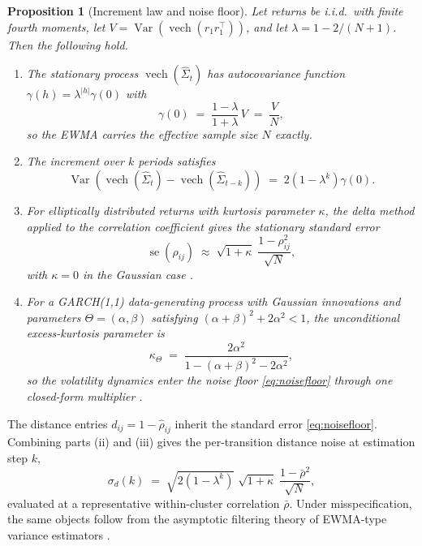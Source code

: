 \documentclass[11pt]{article}
\newtheorem{proposition}{Proposition}
\theoremstyle{remark}
\newcommand{\vech}{\operatorname{vech}}
\begin{document}
\begin{proposition}[Increment law and noise floor]
\label{prop:increments}
Let returns be i.i.d.\ with finite fourth moments, let
$V = \operatorname{Var}\!\left(\vech(r_1 r_1^{\top})\right)$, and let
$\lambda = 1 - 2/(N+1)$. Then the following hold.
\begin{enumerate}
\item[(i)] The stationary process $\vech(\widehat{\Sigma}_t)$ has
autocovariance function $\gamma(h) = \lambda^{|h|} \gamma(0)$ with
\begin{equation}
\gamma(0) \;=\; \frac{1-\lambda}{1+\lambda}\, V \;=\; \frac{V}{N},
\label{eq:statvar}
\end{equation}
so the EWMA carries the effective sample size $N$ exactly.
\item[(ii)] The increment over $k$ periods satisfies
\begin{equation}
\operatorname{Var}\!\left( \vech(\widehat{\Sigma}_t)
- \vech(\widehat{\Sigma}_{t-k}) \right)
\;=\; 2\left(1 - \lambda^{k}\right) \gamma(0).
\label{eq:kstep}
\end{equation}
\item[(iii)] For elliptically distributed returns with kurtosis parameter
$\kappa$, the delta method applied to the correlation coefficient gives the
stationary standard error
\begin{equation}
\operatorname{se}\!\left(\widehat{\rho}_{ij}\right)
\;\approx\; \sqrt{1+\kappa}\; \frac{1-\rho_{ij}^2}{\sqrt{N}},
\label{eq:noisefloor}
\end{equation}
with $\kappa = 0$ in the Gaussian case
\citep{neudecker1990asymptotic}.
\item[(iv)] For a GARCH(1,1) data-generating process with Gaussian innovations
and parameters $\Theta = (\alpha, \beta)$ satisfying
$(\alpha+\beta)^2 + 2\alpha^2 < 1$, the unconditional excess-kurtosis parameter
is
\begin{equation}
\kappa_{\Theta} \;=\; \frac{2\alpha^2}{1 - (\alpha+\beta)^2 - 2\alpha^2},
\label{eq:garchkappa}
\end{equation}
so the volatility dynamics enter the noise floor \eqref{eq:noisefloor} through
one closed-form multiplier \citep{bollerslev1986generalized}.
\end{enumerate}
\end{proposition}

The distance entries $d_{ij} = 1 - \widehat{\rho}_{ij}$ inherit the standard
error \eqref{eq:noisefloor}. Combining parts (ii) and (iii) gives the
per-transition distance noise at estimation step $k$,
\begin{equation}
\sigma_d(k) \;=\; \sqrt{2\left(1-\lambda^{k}\right)}\;
\sqrt{1+\kappa}\; \frac{1-\bar{\rho}^2}{\sqrt{N}},
\label{eq:transitionnoise}
\end{equation}
evaluated at a representative within-cluster correlation $\bar{\rho}$. Under
misspecification, the same objects follow from the asymptotic filtering theory
of EWMA-type variance estimators \citep{nelson1992filtering,
nelson1994asymptotic}.
\end{document}

